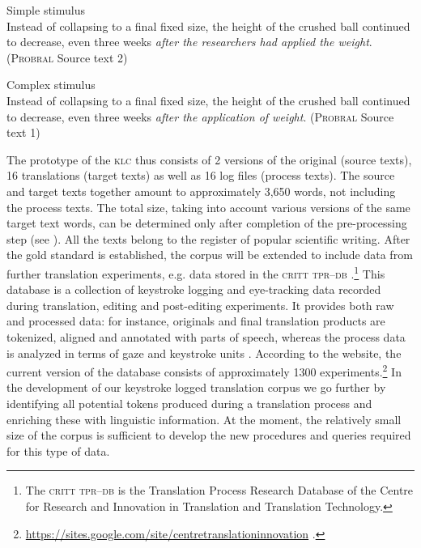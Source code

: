 \documentclass[output=paper]{LSP/langsci}
\begin{document}
\ea \label{ex:1:1} Simple stimulus\\
Instead of collapsing to a final fixed size, the height of the crushed ball continued to decrease, even three weeks \emph{after the researchers had applied the weight}. (\textsc{Probral} Source text 2)
\z

\ea \label{ex:1:2}
Complex stimulus\\
Instead of collapsing to a final fixed size, the height of the crushed ball continued to decrease, even three weeks \emph{after the application of weight}. (\textsc{Probral} Source text 1)
\z

The prototype of the \textsc{klc} thus consists of 2 versions of the original (source texts), 16 translations (target texts) as well as 16 log files (process texts). The source and target texts together amount to approximately 3,650 words, not including the process texts. The total size, taking into account various versions of the same target text words, can be determined only after completion of the pre-processing step (see ). All the texts belong to the register of popular scientific writing. After the gold standard is established, the corpus will be extended to include data from further translation experiments, e.g. data stored in the \textsc{critt} \textsc{tpr--db} \citep{Carl2012}.\footnote{The \textsc{critt} \textsc{tpr--db} is the Translation Process Research Database of the Centre for Research and Innovation in Translation and Translation Technology.} This database is a collection of keystroke logging and eye-tracking data recorded during translation, editing and post-editing experiments. It provides both raw and processed data: for instance, originals and final translation products are tokenized, aligned and annotated with parts of speech, whereas the process data is analyzed in terms of gaze and keystroke units \citep{Carl2012}. According to the website, the current version of the database consists of approximately 1300 experiments.\footnote{\url{https://sites.google.com/site/centretranslationinnovation} .} In the development of our keystroke logged translation corpus we go further by identifying all potential tokens produced during a translation process and enriching these with linguistic information. At the moment, the relatively small size of the corpus is sufficient to develop the new procedures and queries required for this type of data. 
\end{document}

